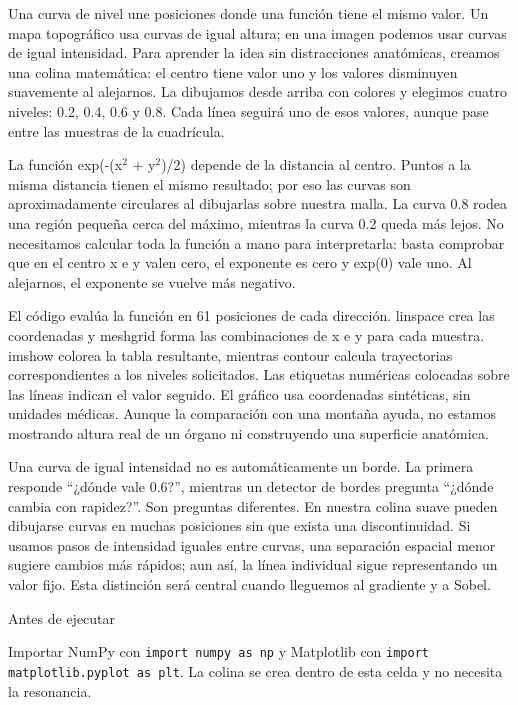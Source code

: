 
Una curva de nivel une posiciones donde una función tiene el mismo valor. Un mapa topográfico usa curvas de igual altura; en una imagen podemos usar curvas de igual intensidad. Para aprender la idea sin distracciones anatómicas, creamos una colina matemática: el centro tiene valor uno y los valores disminuyen suavemente al alejarnos. La dibujamos desde arriba con colores y elegimos cuatro niveles: 0.2, 0.4, 0.6 y 0.8. Cada línea seguirá uno de esos valores, aunque pase entre las muestras de la cuadrícula.


La función exp(-(x$^2$ + y$^2$)/2) depende de la distancia al centro. Puntos a la misma distancia tienen el mismo resultado; por eso las curvas son aproximadamente circulares al dibujarlas sobre nuestra malla. La curva 0.8 rodea una región pequeña cerca del máximo, mientras la curva 0.2 queda más lejos. No necesitamos calcular toda la función a mano para interpretarla: basta comprobar que en el centro x e y valen cero, el exponente es cero y exp(0) vale uno. Al alejarnos, el exponente se vuelve más negativo.


El código evalúa la función en 61 posiciones de cada dirección. linspace crea las coordenadas y meshgrid forma las combinaciones de x e y para cada muestra. imshow colorea la tabla resultante, mientras contour calcula trayectorias correspondientes a los niveles solicitados. Las etiquetas numéricas colocadas sobre las líneas indican el valor seguido. El gráfico usa coordenadas sintéticas, sin unidades médicas. Aunque la comparación con una montaña ayuda, no estamos mostrando altura real de un órgano ni construyendo una superficie anatómica.


Una curva de igual intensidad no es automáticamente un borde. La primera responde “¿dónde vale 0.6?”, mientras un detector de bordes pregunta “¿dónde cambia con rapidez?”. Son preguntas diferentes. En nuestra colina suave pueden dibujarse curvas en muchas posiciones sin que exista una discontinuidad. Si usamos pasos de intensidad iguales entre curvas, una separación espacial menor sugiere cambios más rápidos; aun así, la línea individual sigue representando un valor fijo. Esta distinción será central cuando lleguemos al gradiente y a Sobel.



\begin{Idea}{Antes de ejecutar}

Importar NumPy con \texttt{import numpy as np} y Matplotlib con \texttt{import matplotlib.pyplot as plt}. La colina se crea dentro de esta celda y no necesita la resonancia.


\end{Idea}

